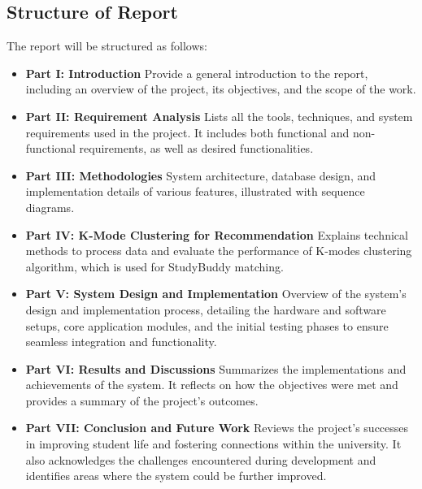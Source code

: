 \documentclass[12pt]{article}
\begin{document}
\subsection{Structure of Report}
The report will be structured as follows:
\begin{itemize}
    \item \textbf{Part I: Introduction }
    \newline
    Provide a general introduction to the report, including an overview of the project, its objectives, and the scope of the work.
    \item \textbf{Part II: Requirement Analysis }
    \newline
    Lists all the tools, techniques, and system requirements used in the project. It includes
    both functional and non-functional requirements, as well as desired functionalities.
    \item \textbf{Part III: Methodologies }
    \newline
    System architecture, database design, and implementation details of various features, illustrated with sequence diagrams.
    \item \textbf{Part IV: K-Mode Clustering for Recommendation }
    \newline
    Explains technical methods to process data and evaluate the performance of K-modes clustering algorithm, which is used for StudyBuddy matching.
    \item \textbf{Part V: System Design and Implementation }
    \newline
    Overview of the system's design and implementation process, detailing the hardware and software setups, core application modules, and the initial testing phases to ensure seamless integration and functionality.
    \item \textbf{Part VI: Results and Discussions }
    \newline 
    Summarizes the implementations and achievements of the system. It reflects on how the
    objectives were met and provides a summary of the project's outcomes.
    \item \textbf{Part VII: Conclusion and Future Work }
    \newline
    Reviews the project's successes in improving student life and fostering connections within the university.
    It also acknowledges the challenges encountered during development and identifies areas where the system could be further improved.
\end{itemize}
\end{document}
